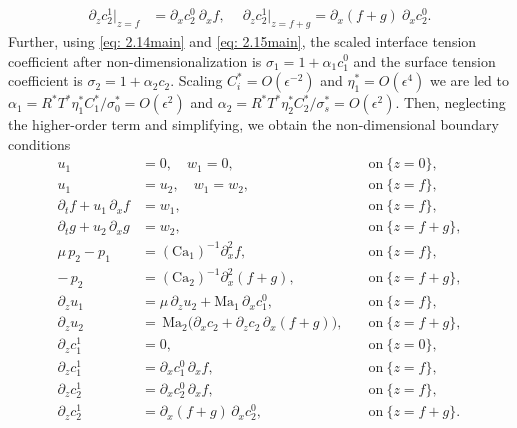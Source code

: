 \documentclass[11pt]{article}
\numberwithin{equation}{section}
\newtheorem{counter example}[theorem]{Counter Example}
\begin{document}
{\begin{align}
\partial_z c_2^1\big|_{z=f}&=\partial_x c_2^0~\partial_x f,~\quad\partial_z c_2^1\big|_{z=f+g}=\partial_x (f+g)~\partial_x c_2^0.\label{eq: 2.8}
\end{align}
Further, using \eqref{eq: 2.14main} and \eqref{eq: 2.15main}, the scaled interface tension coefficient after non-dimensionalization is $\sigma_1=1+\alpha_1 c_1^0$ and the surface tension coefficient is $\sigma_2=1+\alpha_2 c_2$. Scaling  $C^*_i = O(\epsilon^{-2})$  and $ \eta_1^*=O(\epsilon^4)$  we are led to  $\alpha_1=R^* T^* \eta_1^* C_1^*/\sigma_0^* =O(\epsilon^2) $ and $\alpha_2=R^* T^* \eta_2^* C_2^*/\sigma_s^*=O(\epsilon^2)$. Then, neglecting the higher-order term and simplifying, we obtain the  non-dimensional boundary conditions
\begin{subequations}\label{eq: 2.17main}
\begin{alignat}{2}
u_1 &= 0, \quad w_1=0,                                      &\quad \mathrm{on}~\{z=0\},       \label{eq: 2.4a}\\
u_1 &= u_2,    \quad w_1=w_2,                                  &\quad \mathrm{on}~\{z=f\},       \label{eq: 2.4b}\\
\partial_t f + u_1\,\partial_x f
    &= w_1,                                    &\quad \mathrm{on}~\{z=f\},       \label{eq: 2.4c}\\
\partial_t g + u_2\,\partial_x g
    &= w_2,                                    &\quad \mathrm{on}~\{z=f+g\},     \label{eq: 2.4d}\\
\mu\,p_2 - p_1
    &= (\mathrm{Ca}_1)^{-1}\partial_x^2 f,    &\quad \mathrm{on}~\{z=f\},       \label{eq: 2.4e}\\
-\,p_2
    &= (\mathrm{Ca}_2)^{-1}\partial_x^2(f+g), &\quad \mathrm{on}~\{z=f+g\},     \label{eq: 2.4f}\\
\partial_z u_1
    &= \mu\,\partial_z u_2 + \mathrm{Ma}_1\,\partial_x c_1^0,
                                              &\quad \mathrm{on}~\{z=f\},       \label{eq: 2.4g}\\
\partial_z u_2
    &= \,\mathrm{Ma}_2\bigl(\partial_xc_2
       + \partial_z c_2\,\partial_x(f+g)\bigr),
                                              &\quad \mathrm{on}~\{z=f+g\},     \label{eq: 2.4h}\\
\partial_z c_1^1
    &= 0,                                      &\quad \mathrm{on}~\{z=0\},       \label{eq: 2.4i}\\
\partial_z c_1^1
    &= \partial_x c_1^0\,\partial_x f,        &\quad \mathrm{on}~\{z=f\},       \label{eq: 2.4j}\\
\partial_z c_2^1
    &= \partial_x c_2^0\,\partial_x f,        &\quad \mathrm{on}~\{z=f\},       \label{eq: 2.4k1}\\
\partial_z c_2^1
    &= \partial_x(f+g)\,\partial_x c_2^0,          &\quad \mathrm{on}~\{z=f+g\}.     \label{eq: 2.4k2}
\end{alignat}
\end{subequations}

}
\end{document}
